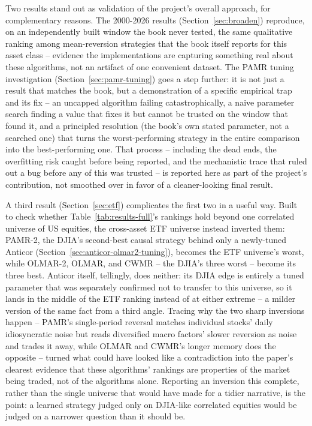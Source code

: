 \documentclass[11pt]{article}
\begin{document}
Two results stand out as validation of the project's overall approach,
for complementary reasons. The 2000-2026 results
(Section~\ref{sec:broaden}) reproduce, on an independently built window
the book never tested, the same qualitative ranking among mean-reversion
strategies that the book itself reports for this asset class --
evidence the implementations are capturing something real about these
algorithms, not an artifact of one convenient dataset. The PAMR tuning
investigation (Section~\ref{sec:pamr-tuning}) goes a step further: it is
not just a result that matches the book, but a demonstration of a
specific empirical trap and its fix -- an uncapped algorithm failing
catastrophically, a naive parameter search finding a value that fixes
it but cannot be trusted on the window that found it, and a principled
resolution (the book's own stated parameter, not a searched one) that
turns the worst-performing strategy in the entire comparison into the
best-performing one. That process -- including the dead ends, the
overfitting risk caught before being reported, and the mechanistic trace
that ruled out a bug before any of this was trusted -- is reported here
as part of the project's contribution, not smoothed over in favor of a
cleaner-looking final result.

A third result (Section~\ref{sec:etf}) complicates the first two in a
useful way. Built to check whether Table~\ref{tab:results-full}'s
rankings hold beyond one correlated universe of US equities, the
cross-asset ETF universe instead inverted them: PAMR-2, the DJIA's
second-best causal strategy behind only a newly-tuned Anticor
(Section~\ref{sec:anticor-olmar2-tuning}), becomes the ETF universe's
worst, while OLMAR-2, OLMAR, and CWMR -- the DJIA's three worst --
become its three best. Anticor itself, tellingly, does neither: its
DJIA edge is entirely a tuned parameter that was separately confirmed
not to transfer to this universe, so it lands in the middle of the ETF
ranking instead of at either extreme -- a milder version of the same
fact from a third angle. Tracing why the two sharp inversions happen --
PAMR's single-period reversal matches individual stocks' daily
idiosyncratic noise but reads diversified macro factors' slower
reversion as noise and trades it away, while OLMAR and CWMR's longer
memory does the opposite -- turned what could have looked like a
contradiction into the
paper's clearest evidence that these algorithms' rankings are properties
of the market being traded, not of the algorithms alone. Reporting an
inversion this complete, rather than the single universe that would
have made for a tidier narrative, is the point: a learned strategy
judged only on DJIA-like correlated equities would be judged on a
narrower question than it should be.
\end{document}

